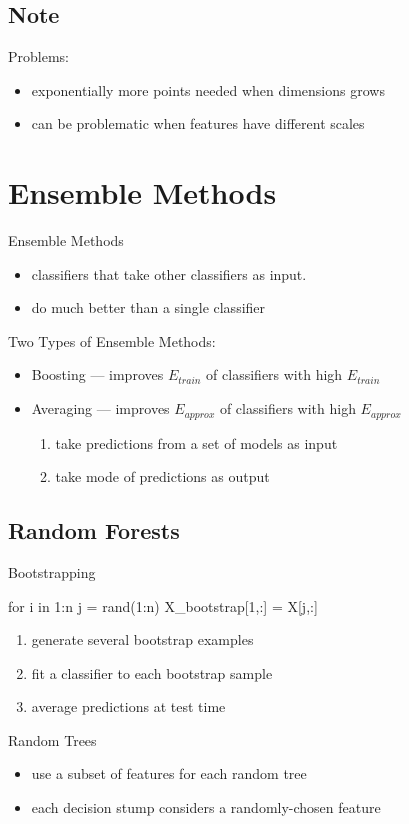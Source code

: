 \documentclass[10pt,landscape,a4paper]{article}
\begin{document}
\begin{multicols*}{5}
\subsection{Note}
Problems:
\begin{itemize}
    \item exponentially more points needed when dimensions grows
    \item can be problematic when features have different scales
\end{itemize}

\section{Ensemble Methods}
Ensemble Methods
\begin{itemize}
    \item classifiers that take other classifiers as input.
    \item do much better than a single classifier
\end{itemize}
Two Types of Ensemble Methods:
\begin{itemize}
    \item Boosting --- improves \(E_{train}\) of classifiers with high \(E_{train}\)
    \item Averaging --- improves \(E_{approx}\) of classifiers with high \(E_{approx}\)
    \begin{enumerate}
        \item take predictions from a set of models as input
        \item take mode of predictions as output
    \end{enumerate}
\end{itemize}

\subsection{Random Forests}
Bootstrapping
\begin{juliaText}{}
for i in 1:n
    j = rand(1:n)
    X_bootstrap[1,:] = X[j,:]
\end{juliaText}
\begin{enumerate}
    \item generate several bootstrap examples
    \item fit a classifier to each bootstrap sample
    \item average predictions at test time
\end{enumerate}
Random Trees
\begin{itemize}
    \item use a subset of features for each random tree
    \item each decision stump considers a randomly-chosen feature
\end{itemize}


\end{multicols*}
\end{document}
